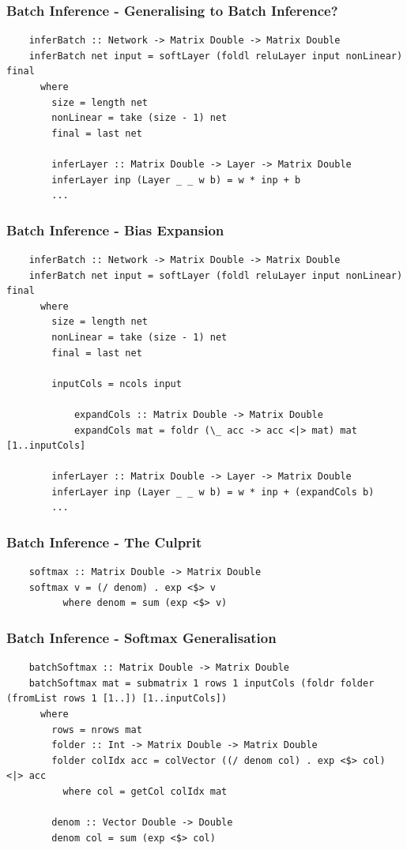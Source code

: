 \documentclass{beamer}
\begin{document}
\begin{frame}[fragile]
  \frametitle{Batch Inference - Generalising to Batch Inference?}

  \begin{lstlisting}
    inferBatch :: Network -> Matrix Double -> Matrix Double
    inferBatch net input = softLayer (foldl reluLayer input nonLinear) final
      where
        size = length net
        nonLinear = take (size - 1) net
        final = last net
    
        inferLayer :: Matrix Double -> Layer -> Matrix Double
        inferLayer inp (Layer _ _ w b) = w * inp + b
        ...
  \end{lstlisting}
        
\end{frame}

\begin{frame}[fragile]
  \frametitle{Batch Inference - Bias Expansion}

  \begin{lstlisting}
    inferBatch :: Network -> Matrix Double -> Matrix Double
    inferBatch net input = softLayer (foldl reluLayer input nonLinear) final
      where
        size = length net
        nonLinear = take (size - 1) net
        final = last net
    
        inputCols = ncols input
    
            expandCols :: Matrix Double -> Matrix Double
            expandCols mat = foldr (\_ acc -> acc <|> mat) mat [1..inputCols]
    
        inferLayer :: Matrix Double -> Layer -> Matrix Double
        inferLayer inp (Layer _ _ w b) = w * inp + (expandCols b)
        ...
  \end{lstlisting}

\end{frame}

\begin{frame}[fragile]
  \frametitle{Batch Inference - The Culprit}

  \begin{lstlisting}
    softmax :: Matrix Double -> Matrix Double
    softmax v = (/ denom) . exp <$> v
          where denom = sum (exp <$> v)	    
  \end{lstlisting}
    
\end{frame}

\begin{frame}[fragile]
  \frametitle{Batch Inference - Softmax Generalisation}

  \begin{lstlisting}
    batchSoftmax :: Matrix Double -> Matrix Double
    batchSoftmax mat = submatrix 1 rows 1 inputCols (foldr folder (fromList rows 1 [1..]) [1..inputCols])
      where
        rows = nrows mat
        folder :: Int -> Matrix Double -> Matrix Double
        folder colIdx acc = colVector ((/ denom col) . exp <$> col) <|> acc
          where col = getCol colIdx mat
    
        denom :: Vector Double -> Double
        denom col = sum (exp <$> col)  \end{lstlisting}
\end{frame}
\end{document}
